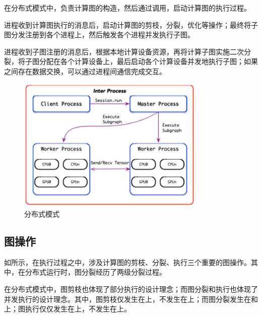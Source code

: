 \begin{content}

在分布式模式中，负责计算图的构造，然后通过调用，启动计算图的执行过程。

进程收到计算图执行的消息后，启动计算图的剪枝，分裂，优化等操作；最终将子图分发注册到各个进程上，然后触发各个进程并发执行子图。

进程收到子图注册的消息后，根据本地计算设备资源，再将计算子图实施二次分裂，将子图分配在各个计算设备上，最后启动各个计算设备并发地执行子图；如果之间存在数据交换，可以通过进程间通信完成交互。

\begin{figure}[H]
\centering
\includegraphics[width=0.8\textwidth]{figures/distributed.png}
\caption{分布式模式}
 \label{fig:distributed}
\end{figure}

\subsection{图操作}

如所示，在执行过程之中，涉及计算图的剪枝、分裂、执行三个重要的图操作。其中，在分布式运行时，图分裂经历了两级分裂过程。

\begin{enum}
\end{enum}

在分布式模式中，图剪枝也体现了\tf{}部分执行的设计理念；而图分裂和执行也体现了\tf{}并发执行的设计理念。其中，图剪枝仅发生在上，不发生在上；而图分裂发生在和上；图执行仅仅发生在上，不发生在上。


\end{content}

